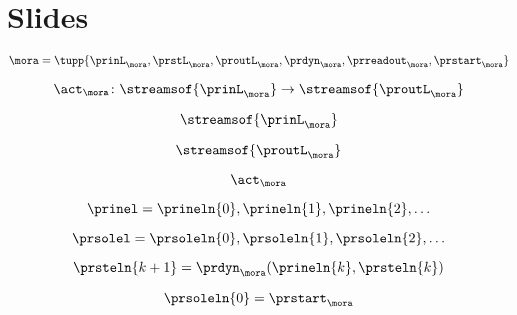 
\section{Slides}

    \begin{forslides}
        
    \begin{equation}
        \label{eq:slides-processes-00}
       \mora = \tupp{\prinL_\mora,\prstL_\mora,\proutL_\mora,\prdyn_\mora,\prreadout_\mora,\prstart_\mora}
    \end{equation}

    \begin{equation}
        \label{eq:slides-processes-01}
        \act_{\mora} \colon \streamsof{\prinL_\mora}  \to \streamsof{\proutL_\mora}
    \end{equation}

    \begin{equation}
        \label{eq:slides-processes-02}
        \streamsof{\prinL_\mora}
    \end{equation}

    \begin{equation}
        \label{eq:slides-processes-03}
        \streamsof{\proutL_\mora}
    \end{equation}

    \begin{equation}
        \label{eq:slides-processes-04}
        \act_{\mora}
    \end{equation}

    \begin{equation}
        \label{eq:slides-processes-05}
        \prinel = \prineln{0}, \prineln{1}, \prineln{2}, \ldots
    \end{equation}

    \begin{equation}
        \label{eq:slides-processes-06}
        \prsolel = \prsoleln{0}, \prsoleln{1}, \prsoleln{2}, \ldots
    \end{equation}

    \begin{equation}
        \label{eq:slides-processes-07}
        \prsteln{k+1} = \prdyn_\mora(\prineln{k}, \prsteln{k}) 
    \end{equation}

\begin{equation}
        \label{eq:slides-processes-07b}
        \prsoleln{0} = \prstart_\mora
    \end{equation}


\end{forslides}
